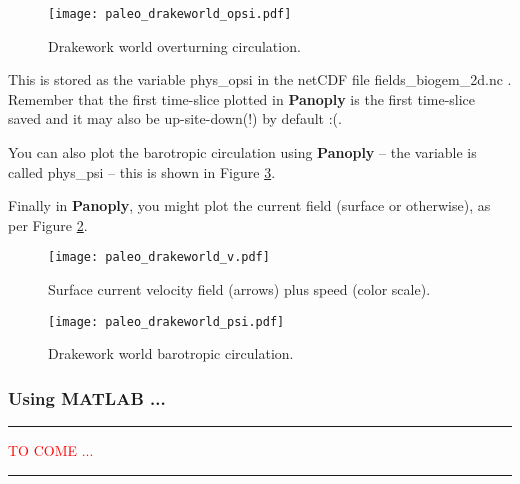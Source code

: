 \documentclass[11pt,fleqn]{book} %
\begin{document}
\begin{figure}
\texttt{[image: paleo\_drakeworld\_opsi.pdf]}\centering
\vspace{-6mm}
\caption{Drakework world overturning circulation.}
\label{fig:paleo_drakeworld.opsi}
\end{figure}

This is stored as the variable \small\textsf{phys\_opsi }\normalsize in the netCDF file \small\textsf{fields\_biogem\_2d.nc }\normalsize. Remember that the first time-slice plotted in \textbf{Panoply} is the first time-slice saved and it may also be up-site-down(!) by default :(.

You can also plot the barotropic circulation using \textbf{Panoply} -- the variable is called \small\textsf{phys\_psi }\normalsize -- this is shown in Figure \ref{fig:paleo_drakeworld.psi}.

Finally in \textbf{Panoply}, you might plot the current field (surface or otherwise), as per Figure \ref{fig:paleo_drakeworld.v}.

\begin{figure}
\texttt{[image: paleo\_drakeworld\_v.pdf]}\centering
\vspace{-6mm}
\caption{Surface current velocity field (arrows) plus speed (color scale).}
\label{fig:paleo_drakeworld.v}
\end{figure}

\begin{figure}
\texttt{[image: paleo\_drakeworld\_psi.pdf]}\centering
\vspace{-6mm}
\caption{Drakework world barotropic circulation.}
\label{fig:paleo_drakeworld.psi}
\end{figure}


\subsubsection{Using MATLAB ...}

\vspace{1mm}
\noindent\rule{4cm}{0.5pt}
\vspace{2mm}

\noindent\textcolor{red}{TO COME ...}

\vspace{1mm}
\noindent\rule{4cm}{0.5pt}
\vspace{2mm}

\end{document}
